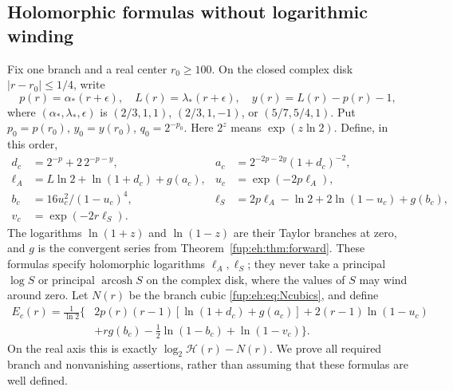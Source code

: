 \documentclass[11pt,letterpaper]{article}
\theoremstyle{definition}\newtheorem{definition}[theorem]{Definition}
\theoremstyle{remark}\newtheorem{remark}[theorem]{Remark}
\begin{document}
\subsection{Holomorphic formulas without logarithmic winding}
Fix one branch and a real center $r_0\ge100$. On the closed complex
disk $|r-r_0|\le1/4$, write
\[
 p(r)=\alpha_*(r+\epsilon),\quad L(r)=\lambda_*(r+\epsilon),\quad
 y(r)=L(r)-p(r)-1,
\]
where $(\alpha_*,\lambda_*,\epsilon)$ is
$(2/3,1,1)$, $(2/3,1,-1)$, or $(5/7,5/4,1)$.
Put $p_0=p(r_0)$, $y_0=y(r_0)$, $q_0=2^{-p_0}$.
Here $2^z$ means $\exp(z\ln2)$. Define, in this order,
\begin{align*}
 d_c&=2^{-p}+2\,2^{-p-y},&
 a_c&=2^{-2p-2y}(1+d_c)^{-2},\\
 \ell_A&=L\ln2+\ln(1+d_c)+g(a_c),&
 u_c&=\exp(-2p\ell_A),\\
 b_c&=16u_c^2/(1-u_c)^4,&
 \ell_S&=2p\ell_A-\ln2+2\ln(1-u_c)+g(b_c),\\
 v_c&=\exp(-2r\ell_S).&&
\end{align*}
The logarithms $\ln(1+z)$ and $\ln(1-z)$ are their Taylor branches
at zero, and $g$ is the convergent series from
Theorem~\ref{fup:eh:thm:forward}. These formulas specify holomorphic
logarithms $\ell_A,\ell_S$; they never take a principal
$\log S$ or principal $\operatorname{arcosh}S$ on the complex disk,
where the values of $S$ may wind around zero.
Let $N(r)$ be the branch cubic \eqref{fup:eh:eq:Ncubics}, and define
\begin{align}
 E_c(r)=\frac1{\ln2}\bigl\{&2p(r)(r-1)[\ln(1+d_c)+g(a_c)]
 +2(r-1)\ln(1-u_c)\nonumber\\
 &+r g(b_c)-\tfrac12\ln(1-b_c)+\ln(1-v_c)\bigr\}.
 \label{fup:eh:eq:complexE}
\end{align}
On the real axis this is exactly $\log_2\mathcal H(r)-N(r)$.
We prove all required branch and nonvanishing assertions, rather than
assuming that these formulas are well defined.
\end{document}
